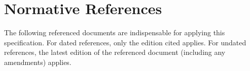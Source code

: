 \section{Normative References}\label{normativereferences}

The following referenced documents are indispensable for applying this specification. For dated references, only the edition cited applies. For undated references, the latest edition of the referenced document (including any amendments) applies.


\printbibliography[title=OPC UA References,keyword=OPC]

\printbibliography[title=MTConnect References,keyword=MTC]

\printbibliography[title=Other References,notkeyword=MTC,notkeyword=OPC]
